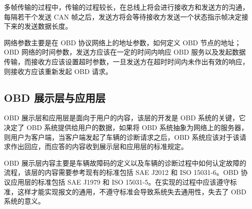 多帧传输的过程中，传输的过程较长，在总线上将会进行接收方和发送方的沟通，每隔若干个发送 CAN 帧之后，发送方将会等待接收方发送一个状态指示帧决定接下来的发送数据长度。

网络参数主要是在 OBD 协议网络上的地址参数，如何定义 OBD 节点的地址；OBD 网络的时间参数，发送方应该在一定的时间内响应 OBD 服务以及发起数据传输，而接收方应该设置超时参数，一旦发送方在超时时间内未作出有效的响应，则接收方应该重新发起 OBD 请求。

\subsection{OBD 展示层与应用层}
 OBD 展示层和应用层是面向于用户的内容，该层的开发是 OBD 系统的关键，它决定了 OBD 系统提供给用户的数据，如果将 OBD 系统抽象为网络上的服务器，则用户为客户端，当客户端发起了车辆的诊断请求之后，OBD 系统应该对于该请求作出回应，而应答的内容收到展示层和应用层的标准规定。

OBD 展示层内容主要是车辆故障码的定义以及车辆的诊断过程中如何认定故障的流程，该层的内容需要参考现有的标准包括 SAE J2012 和 ISO 15031-6。OBD 协议应用层的标准包括 SAE J1979 和 ISO 15031-5。在实现的过程中应该遵守标准，这样才能实现报文的通用，不遵守标准会导致系统失去通用性，失去了 OBD 系统的意义。